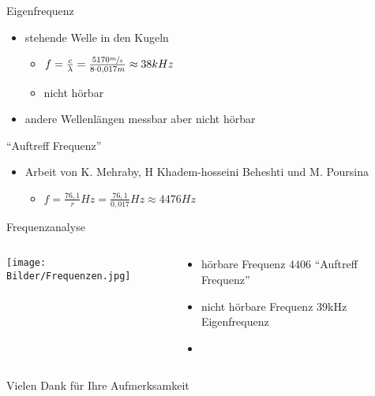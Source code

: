 \documentclass[12pt]{beamer}
\begin{document}
\begin{frame}{Eigenfrequenz}
\begin{itemize}
\item<1-> stehende Welle in den Kugeln
	\begin{itemize}
	\item<2->[$\rightarrow$] $f=\frac{c}{\lambda}=\frac{5170\sfrac{m}{s}}{8\cdot 0,017m}\approx 38kHz$
	\item<3->[$\rightarrow$] nicht hörbar
	\end{itemize}
\item<4-> andere Wellenlängen messbar aber nicht hörbar
\end{itemize}
\end{frame}

\begin{frame}{"`Auftreff Frequenz"'}
\begin{itemize}
\item<1-> Arbeit von K. Mehraby, H Khadem-hosseini Beheshti und M. Poursina
	\begin{itemize}
	\item<2->[$\rightarrow$] $f=\frac{76,1}{r}Hz=\frac{76,1}{0,017}Hz\approx 4476Hz$
	\end{itemize}
\end{itemize}
\end{frame}

\begin{frame}{Frequenzanalyse}
\begin{columns}
\begin{column}{.6\textwidth}
\texttt{[image: Bilder/Frequenzen.jpg]}
\end{column}
\begin{column}{.4\textwidth}
\begin{itemize}
\item<2-> hörbare Frequenz $4406$ "`Auftreff Frequenz"'
\item<3-> nicht hörbare Frequenz 39kHz Eigenfrequenz
\item[ ] \ 
\end{itemize}
\end{column}
\end{columns}
\end{frame}

\begin{frame}
\center
{\HUGE Vielen Dank für Ihre Aufmerksamkeit}
\end{frame}
\end{document}
